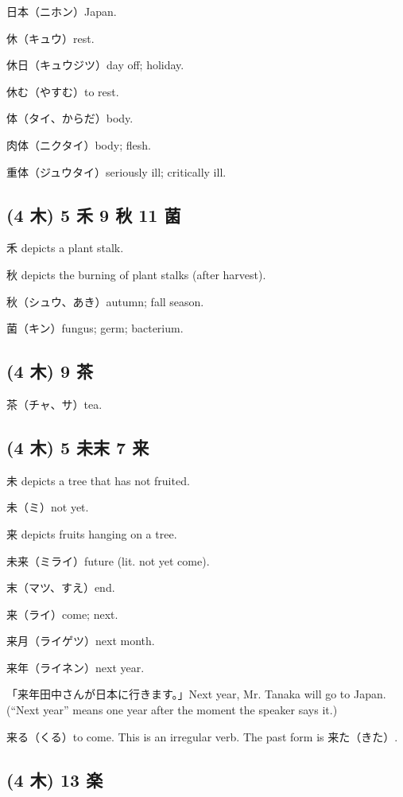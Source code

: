 日本（ニホン）Japan.

休（キュウ）rest.

休日（キュウジツ）day off; holiday.

休む（やすむ）to rest.

体（タイ、からだ）body.

肉体（ニクタイ）body; flesh.

重体（ジュウタイ）seriously ill; critically ill.

\subsection{(4 木) 5 禾 9 秋 11 菌}

禾 depicts a plant stalk.

秋 depicts the burning of plant stalks (after harvest).

秋（シュウ、あき）autumn; fall season.

菌（キン）fungus; germ; bacterium.

\subsection{(4 木) 9 茶}

茶（チャ、サ）tea.

\subsection{(4 木) 5 未末 7 来}

未 depicts a tree that has not fruited.

未（ミ）not yet.

来 depicts fruits hanging on a tree.

未来（ミライ）future (lit. not yet come).

末（マツ、すえ）end.

来（ライ）come; next.

来月（ライゲツ）next month.

来年（ライネン）next year.

「来年田中さんが日本に行きます。」Next year, Mr. Tanaka will go to Japan.
(``Next year'' means one year after the moment the speaker says it.)

来る（くる）to come.
This is an irregular verb.
The past form is 来た（きた）.

\subsection{(4 木) 13 楽}

